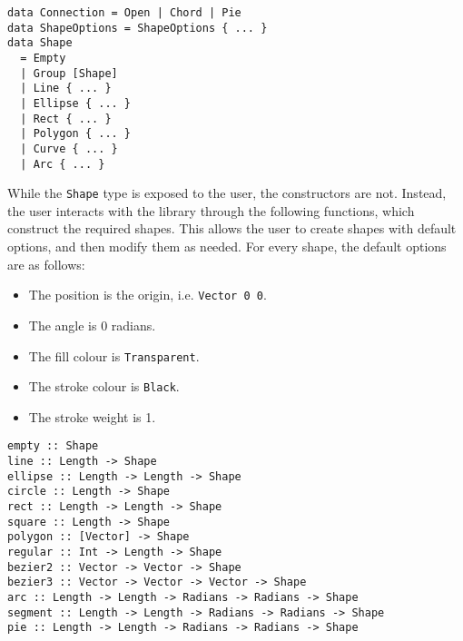 \documentclass[../main.tex]{subfiles}
\begin{document}
                \begin{lstlisting}[label={lst:shape}, caption={The \texttt{Shape} type definition.}]
data Connection = Open | Chord | Pie
data ShapeOptions = ShapeOptions { ... }
data Shape
  = Empty
  | Group [Shape]
  | Line { ... }
  | Ellipse { ... }
  | Rect { ... }
  | Polygon { ... }
  | Curve { ... }
  | Arc { ... }\end{lstlisting}

                While the \texttt{Shape} type is exposed to the user, the constructors are not.
                Instead, the user interacts with the library through the following functions,
                    which construct the required shapes.
                This allows the user to create shapes with default options, and then modify
                    them as needed.
                For every shape, the default options are as follows:
                \begin{itemize}
                    \item The position is the origin, i.e. \texttt{Vector 0 0}.
                    \item The angle is 0 radians.
                    \item The fill colour is \texttt{Transparent}.
                    \item The stroke colour is \texttt{Black}.
                    \item The stroke weight is 1.
                \end{itemize}

                \begin{lstlisting}[label={lst:shapes}, caption={The functions to create shapes.}]
empty :: Shape
line :: Length -> Shape
ellipse :: Length -> Length -> Shape
circle :: Length -> Shape
rect :: Length -> Length -> Shape
square :: Length -> Shape
polygon :: [Vector] -> Shape
regular :: Int -> Length -> Shape
bezier2 :: Vector -> Vector -> Shape
bezier3 :: Vector -> Vector -> Vector -> Shape
arc :: Length -> Length -> Radians -> Radians -> Shape
segment :: Length -> Length -> Radians -> Radians -> Shape
pie :: Length -> Length -> Radians -> Radians -> Shape\end{lstlisting}
\end{document}
